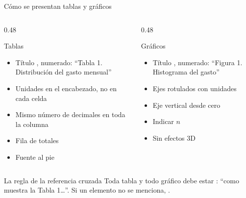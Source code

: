 \documentclass[aspectratio=169,10pt]{beamer}
\begin{document}
\begin{frame}{Cómo se presentan tablas y gráficos}
  \scriptsize
  \begin{columns}[T,onlytextwidth]
    \begin{column}{0.48\textwidth}
      \begin{block}{Tablas}
        \tiny
        \begin{itemize}\setlength{\itemsep}{-0.05cm}
          \item Título , numerado: ``Tabla 1. Distribución del
                gasto mensual''
          \item Unidades en el encabezado, no en cada celda
          \item Mismo número de decimales en toda la columna
          \item Fila de totales
          \item Fuente al pie
        \end{itemize}
      \end{block}
    \end{column}
    \begin{column}{0.48\textwidth}
      \begin{block}{Gráficos}
        \tiny
        \begin{itemize}\setlength{\itemsep}{-0.05cm}
          \item Título , numerado: ``Figura 1. Histograma del
                gasto''
          \item Ejes rotulados con unidades
          \item Eje vertical desde cero
          \item Indicar $n$
          \item Sin efectos 3D
        \end{itemize}
      \end{block}
    \end{column}
  \end{columns}

  \vspace{0.05cm}
  \begin{alertblock}{La regla de la referencia cruzada}
    \tiny
    Toda tabla y todo gráfico debe estar :
    ``como muestra la Tabla 1\dots''. Si un elemento no se menciona,
    .
  \end{alertblock}
\end{frame}
\end{document}
